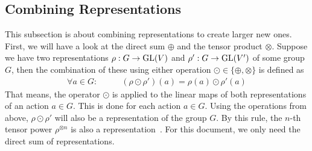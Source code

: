 \subsection{Combining Representations}

This subsection is about combining representations to create larger new ones.
First, we will have a look at the direct sum $\oplus$ and the tensor product $\otimes$.
Suppose we have two representations $\rho: G \to \operatorname{GL}(V)$ and $\rho': G \to \operatorname{GL}(V')$ of some group $G$, then the combination of these using either operation $\odot \in \{\oplus, \otimes\}$ is defined as
\begin{align*}
    \forall a \in G: \qquad & (\rho \odot \rho')(a) = \rho(a) \odot \rho'(a)
\end{align*}
That means, the operator $\odot$ is applied to the linear maps of both representations of an action $a \in G$.
This is done for each action $a \in G$.
Using the operations from above, $\rho \odot \rho'$ will also be a representation of the group $G$.
By this rule, the $n$-th tensor power $\rho^{\otimes n}$ is also a representation~\cite{fulton2013}.
For this document, we only need the direct sum of representations.
